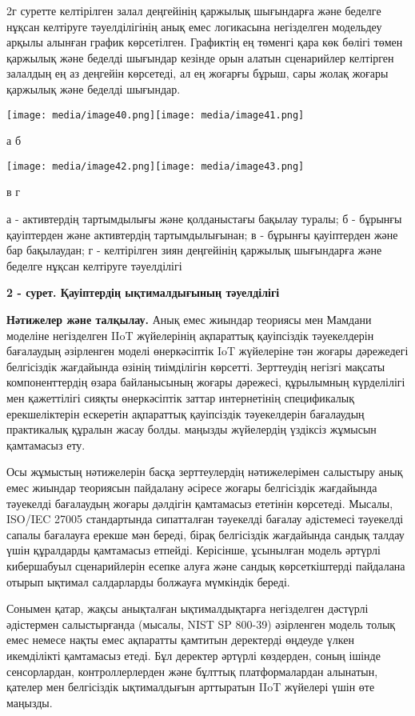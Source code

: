 \documentclass[
]{article}
\begin{document}
2г суретте келтірілген залал деңгейінің қаржылық шығындарға және беделге
нұқсан келтіруге тәуелділігінің анық емес логикасына негізделген
модельдеу арқылы алынған график көрсетілген. Графиктің ең төменгі қара
көк бөлігі төмен қаржылық және беделді шығындар кезінде орын алатын
сценарийлер келтірген залалдың ең аз деңгейін көрсетеді, ал ең жоғарғы
бұрыш, сары жолақ жоғары қаржылық және беделді шығындар.

\texttt{[image: media/image40.png]}\texttt{[image: media/image41.png]}

а б

\texttt{[image: media/image42.png]}\texttt{[image: media/image43.png]}

в г

а - активтердің тартымдылығы және қолданыстағы бақылау туралы; б -
бұрынғы қауіптерден және активтердің тартымдылығынан; в - бұрынғы
қауіптерден және бар бақылаудан; г - келтірілген зиян деңгейінің
қаржылық шығындарға және беделге нұқсан келтіруге тәуелділігі

\textbf{2 - сурет. Қауіптердің ықтималдығының тәуелділігі}

\textbf{Нәтижелер және талқылау.} Анық емес жиындар теориясы мен Мамдани
моделіне негізделген IIoT жүйелерінің ақпараттық қауіпсіздік
тәуекелдерін бағалаудың әзірленген моделі өнеркәсіптік IoT жүйелеріне
тән жоғары дәрежедегі белгісіздік жағдайында өзінің тиімділігін
көрсетті. Зерттеудің негізгі мақсаты компоненттердің өзара байланысының
жоғары дәрежесі, құрылымның күрделілігі мен қажеттілігі сияқты
өнеркәсіптік заттар интернетінің спецификалық ерекшеліктерін ескеретін
ақпараттық қауіпсіздік тәуекелдерін бағалаудың практикалық құралын жасау
болды. маңызды жүйелердің үздіксіз жұмысын қамтамасыз ету.

Осы жұмыстың нәтижелерін басқа зерттеулердің нәтижелерімен салыстыру
анық емес жиындар теориясын пайдалану әсіресе жоғары белгісіздік
жағдайында тәуекелді бағалаудың жоғары дәлдігін қамтамасыз ететінін
көрсетеді. Мысалы, ISO/IEC 27005 стандартында сипатталған тәуекелді
бағалау әдістемесі тәуекелді сапалы бағалауға ерекше мән береді, бірақ
белгісіздік жағдайында сандық талдау үшін құралдарды қамтамасыз етпейді.
Керісінше, ұсынылған модель әртүрлі кибершабуыл сценарийлерін есепке
алуға және сандық көрсеткіштерді пайдалана отырып ықтимал салдарларды
болжауға мүмкіндік береді.

Сонымен қатар, жақсы анықталған ықтималдықтарға негізделген дәстүрлі
әдістермен салыстырғанда (мысалы, NIST SP 800-39) әзірленген модель
толық емес немесе нақты емес ақпаратты қамтитын деректерді өңдеуде үлкен
икемділікті қамтамасыз етеді. Бұл деректер әртүрлі көздерден, соның
ішінде сенсорлардан, контроллерлерден және бұлттық платформалардан
алынатын, қателер мен белгісіздік ықтималдығын арттыратын IIoT жүйелері
үшін өте маңызды.
\end{document}
